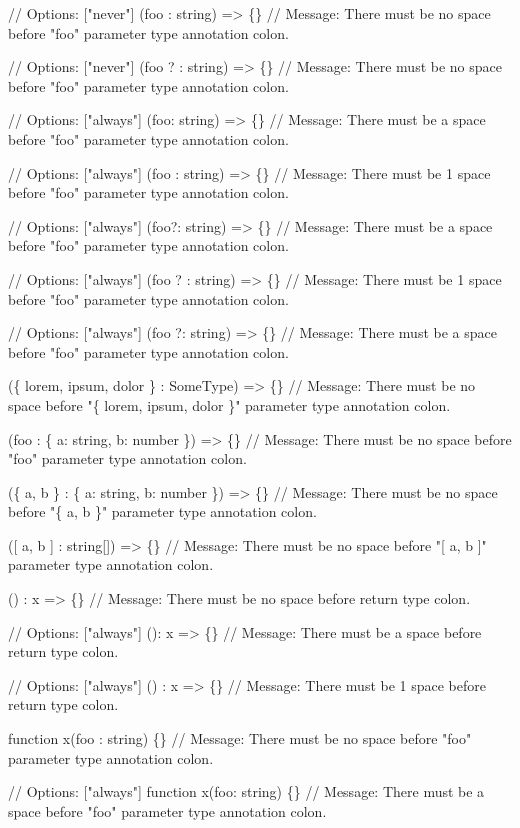 \begin{DoxyCode}
// Options: ["never"]
(foo : string) => \{\}
// Message: There must be no space before "foo" parameter type annotation colon.

// Options: ["never"]
(foo ? : string) => \{\}
// Message: There must be no space before "foo" parameter type annotation colon.

// Options: ["always"]
(foo: string) => \{\}
// Message: There must be a space before "foo" parameter type annotation colon.

// Options: ["always"]
(foo  : string) => \{\}
// Message: There must be 1 space before "foo" parameter type annotation colon.

// Options: ["always"]
(foo?: string) => \{\}
// Message: There must be a space before "foo" parameter type annotation colon.

// Options: ["always"]
(foo ?  : string) => \{\}
// Message: There must be 1 space before "foo" parameter type annotation colon.

// Options: ["always"]
(foo  ?: string) => \{\}
// Message: There must be a space before "foo" parameter type annotation colon.

(\{ lorem, ipsum, dolor \} : SomeType) => \{\}
// Message: There must be no space before "\{ lorem, ipsum, dolor \}" parameter type annotation colon.

(foo : \{ a: string, b: number \}) => \{\}
// Message: There must be no space before "foo" parameter type annotation colon.

(\{ a, b \} : \{ a: string, b: number \}) => \{\}
// Message: There must be no space before "\{ a, b \}" parameter type annotation colon.

([ a, b ] : string[]) => \{\}
// Message: There must be no space before "[ a, b ]" parameter type annotation colon.

() : x => \{\}
// Message: There must be no space before return type colon.

// Options: ["always"]
(): x => \{\}
// Message: There must be a space before return type colon.

// Options: ["always"]
()  : x => \{\}
// Message: There must be 1 space before return type colon.

function x(foo : string) \{\}
// Message: There must be no space before "foo" parameter type annotation colon.

// Options: ["always"]
function x(foo: string) \{\}
// Message: There must be a space before "foo" parameter type annotation colon.


\end{DoxyCode}
